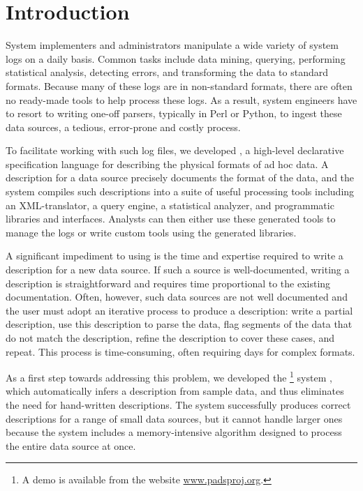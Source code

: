 \section{Introduction}
\label{sec:intro}

System implementers and administrators manipulate a wide
variety of system logs on a daily basis.
Common tasks include data mining, querying, performing statistical analysis,
detecting errors, and transforming the data to standard formats.
Because many of these logs are in non-standard formats,
there are often no ready-made tools to help process these logs.
As a result, system engineers have to resort to writing one-off
parsers, typically in Perl or Python, to ingest these data sources,
a tedious, error-prone and costly process. 

To facilitate working with such log files, we developed \pads
\cite{fisher+:pads}, a high-level declarative
specification language for describing the physical formats of ad hoc
data. A \pads{} description for a data source precisely documents the
format of the data, and the \pads{} system compiles such descriptions
into a suite of useful processing tools including an XML-translator, a
query engine, a statistical analyzer, and programmatic libraries and
interfaces. Analysts can then either use these generated tools to
manage the logs or write custom tools using the generated libraries.

A significant impediment to using \pads{} is the time and 
expertise required to write a \pads{} description for a new data
source.  If such a source is well-documented, writing a \pads{}
description is straightforward and requires time proportional to the
existing documentation.  Often, however, such data sources are not
well documented and the user must adopt an iterative process to produce
a description: write a partial description, use this description to
parse the data, flag segments of the data that do not match the
description, refine the description to cover these cases, and repeat.
This process is time-consuming, often requiring days for complex
formats. 

As a first step towards addressing this problem, we developed the
\learnpads{}\footnote{
  A demo is available from the \pads{} website \url{www.padsproj.org}.
}
system \cite{Fisher+:dirttoshovels,xi08:tokenization-short},
which automatically infers a \pads{} description from sample data, and
thus eliminates the need for hand-written descriptions. The
\learnpads{} system successfully produces correct descriptions for a
range of small data sources, but it cannot handle larger ones because
the system includes a memory-intensive algorithm designed to process
the entire data source at once.

